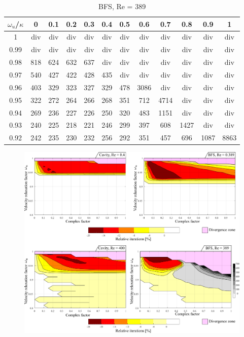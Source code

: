 \documentclass[final,3p,times,11pt,onecolumn]{myElsarticle}
\numberwithin{equation}{section}
\begin{document}
\begin{table}[t!]
\centering
\begin{tabular}{c|ccccccccccc}
\hline 
$\omega_u$/$\kappa$ & 0 & 0.1 & 0.2 & 0.3 & 0.4 & 0.5 & 0.6 & 0.7 & 0.8 & 0.9 & 1 \\ 
\hline 
1 & div & div & div & div & div & div & div & div & div & div & div \\ 
0.99 & div & div & div & div & div & div & div & div & div & div & div \\ 
0.98 & 818 & 624 & 632 & 637 & div & div & div & div & div & div & div \\ 
0.97 & 540 & 427 & 422 & 428 & 435 & div & div & div & div & div & div \\ 
0.96 & 403 & 329 & 323 & 327 & 329 & 478 & 3086 & div & div & div & div \\ 
0.95 & 322 & 272 & 264 & 266 & 268 & 351 & 712 & 4714 & div & div & div \\ 
0.94 & 269 & 236 & 227 & 226 & 250 & 320 & 483 & 1151 & div & div & div \\ 
0.93 & 240 & 225 & 218 & 221 & 246 & 299 & 397 & 608 & 1427 & div & div \\ 
0.92 & 242 & 235 & 230 & 232 & 256 & 292 & 351 & 457 & 696 & 1087 & 8863 \\ 
\hline 
\end{tabular}
\caption{BFS, Re = 389}
\label{Table:BFS_HighRe}
\end{table}

\begin{figure}[t!]
\centering
\includegraphics[width=17cm]{fig/Results/FactorLowRe.pdf}
\caption{}
\label{Fig:FactorLowRe}
\end{figure}
\end{document}
